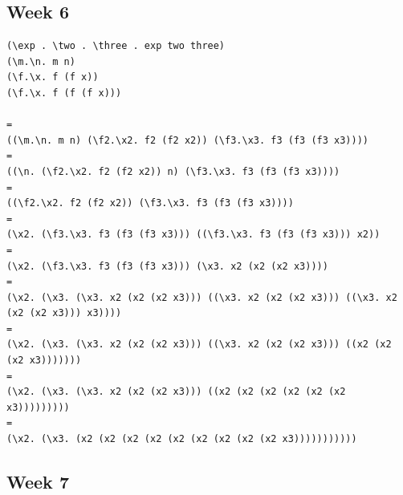 \documentclass{article}
\theoremstyle{theorem}
\theoremstyle{definition}
\theoremstyle{remark}
\begin{document}
\subsection{Week 6}
\begin{lstlisting}
(\exp . \two . \three . exp two three)
(\m.\n. m n)
(\f.\x. f (f x))
(\f.\x. f (f (f x)))

=
((\m.\n. m n) (\f2.\x2. f2 (f2 x2)) (\f3.\x3. f3 (f3 (f3 x3))))
=
((\n. (\f2.\x2. f2 (f2 x2)) n) (\f3.\x3. f3 (f3 (f3 x3))))
=
((\f2.\x2. f2 (f2 x2)) (\f3.\x3. f3 (f3 (f3 x3))))
=
(\x2. (\f3.\x3. f3 (f3 (f3 x3))) ((\f3.\x3. f3 (f3 (f3 x3))) x2))
= 
(\x2. (\f3.\x3. f3 (f3 (f3 x3))) (\x3. x2 (x2 (x2 x3))))
=
(\x2. (\x3. (\x3. x2 (x2 (x2 x3))) ((\x3. x2 (x2 (x2 x3))) ((\x3. x2 (x2 (x2 x3))) x3))))
=
(\x2. (\x3. (\x3. x2 (x2 (x2 x3))) ((\x3. x2 (x2 (x2 x3))) ((x2 (x2 (x2 x3)))))))
=
(\x2. (\x3. (\x3. x2 (x2 (x2 x3))) ((x2 (x2 (x2 (x2 (x2 (x2 x3)))))))))
=
(\x2. (\x3. (x2 (x2 (x2 (x2 (x2 (x2 (x2 (x2 (x2 x3)))))))))))
\end{lstlisting}
\subsection{Week 7}
\end{document}
